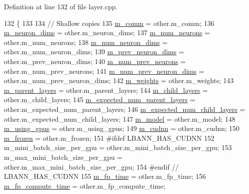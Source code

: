 Definition at line 132 of file layer.\+cpp.


\begin{DoxyCode}
132                                           \{
133   
134   \textcolor{comment}{// Shallow copies}
135   \hyperlink{classlbann_1_1Layer_a5de05c52f22e0bbd7c703bec3ad4dbf2}{m\_comm} = other.m\_comm;
136   \hyperlink{classlbann_1_1Layer_abb34bb8031f57a483e2e327a5f229f48}{m\_neuron\_dims} = other.m\_neuron\_dims;
137   \hyperlink{classlbann_1_1Layer_a6b5ebc8a7d9329d8a773ed787e7b41d8}{m\_num\_neurons} = other.m\_num\_neurons;
138   \hyperlink{classlbann_1_1Layer_adfd6178d21498c9095cd947ae1eb2d6a}{m\_num\_neuron\_dims} = other.m\_num\_neuron\_dims;
139   \hyperlink{classlbann_1_1Layer_ae204d1a2a79606eaa117273857ff62a3}{m\_prev\_neuron\_dims} = other.m\_prev\_neuron\_dims;
140   \hyperlink{classlbann_1_1Layer_ac7b30f4e28d58204bfcbb76886f9136d}{m\_num\_prev\_neurons} = other.m\_num\_prev\_neurons;
141   \hyperlink{classlbann_1_1Layer_adc052afb38f170e839db00d3c8151d1e}{m\_num\_prev\_neuron\_dims} = other.m\_num\_prev\_neuron\_dims;
142   \hyperlink{classlbann_1_1Layer_a7954e30fbf9100a6ba4b56d02767a469}{m\_weights} = other.m\_weights;
143   \hyperlink{classlbann_1_1Layer_a3fa7c6cf1a22bb14ab0e85e3dc6027c5}{m\_parent\_layers} = other.m\_parent\_layers;
144   \hyperlink{classlbann_1_1Layer_ae348c0d2b4d05f74d809d09debb633c0}{m\_child\_layers} = other.m\_child\_layers;
145   \hyperlink{classlbann_1_1Layer_a841b96b25555247f52921c7f13ae1dfa}{m\_expected\_num\_parent\_layers} = other.m\_expected\_num\_parent\_layers;
146   \hyperlink{classlbann_1_1Layer_ac08f133dddd150319650e220ab9a523a}{m\_expected\_num\_child\_layers} = other.m\_expected\_num\_child\_layers;
147   \hyperlink{classlbann_1_1Layer_a3d9315e99574166f2f33e37b572021d2}{m\_model} = other.m\_model;
148   \hyperlink{classlbann_1_1Layer_af7881cb5eff5207c15fa835d65462e8f}{m\_using\_gpus} = other.m\_using\_gpus;
149   \hyperlink{classlbann_1_1Layer_a08dbb94239e3b8c96329786c57c72e21}{m\_cudnn} = other.m\_cudnn;
150   \hyperlink{classlbann_1_1Layer_afdc60df9731a3ecdeeeb8175fa483676}{m\_frozen} = other.m\_frozen;
151 \textcolor{preprocessor}{#ifdef LBANN\_HAS\_CUDNN}
152   m\_mini\_batch\_size\_per\_gpu = other.m\_mini\_batch\_size\_per\_gpu;
153   m\_max\_mini\_batch\_size\_per\_gpu = other.m\_max\_mini\_batch\_size\_per\_gpu;
154 \textcolor{preprocessor}{#endif // LBANN\_HAS\_CUDNN}
155   \hyperlink{classlbann_1_1Layer_ab1bd9ab0a6f9e554f4dc936d8316028e}{m\_fp\_time} = other.m\_fp\_time;
156   \hyperlink{classlbann_1_1Layer_aa4e439c1d6a656e709dc4736c9380476}{m\_fp\_compute\_time} = other.m\_fp\_compute\_time;

\end{DoxyCode}
